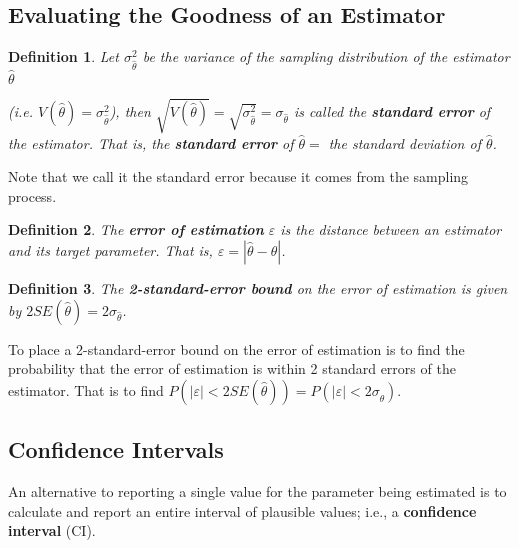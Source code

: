 \documentclass[a4paper,12pt]{article}
\theoremstyle{nonitalic}
\newtheorem{definition}{Definition}[subsection]
\begin{document}
    \subsection{Evaluating the Goodness of an Estimator}

    \begin{definition}
        Let \(\sigma^2_{\hat{\theta}}\) be the variance of the sampling distribution of the estimator \(\hat{\theta}\)

        (i.e. \(V(\hat{\theta}) = \sigma^2_{\hat{\theta}}\)), then \(\sqrt{V(\hat{\theta})} = \sqrt{\sigma^2_{\hat{\theta}}} = \sigma_{\hat{\theta}}\) is called the \textbf{standard error} of the estimator. That is, the \textbf{standard error} of \(\hat{\theta} =\) the standard deviation of \(\hat{\theta}\).
    \end{definition}
    Note that we call it the standard error because it comes from the sampling process.

    \bigskip

    \begin{definition}
        The \textbf{error of estimation} \(\varepsilon\) is the distance between an estimator and its target parameter. That is, \(\varepsilon = |\hat{\theta} - \theta|\).
    \end{definition}

    \bigskip

    \begin{definition}
        The \textbf{2-standard-error bound} on the error of estimation is given by $2SE(\hat{\theta}) = 2\sigma_{\hat{\theta}}$.
    \end{definition}
    To place a 2-standard-error bound on the error of estimation is to find the probability that the error of estimation is within 2 standard errors of the estimator. That is to find $P(|\varepsilon| < 2SE(\hat{\theta})) = P(|\varepsilon| < 2 \sigma_{\hat{\theta}})$.

    \newpage

    \subsection{Confidence Intervals}

    An alternative to reporting a single value for the parameter being estimated is to calculate and report an entire interval of plausible values; i.e., a \textbf{confidence interval} (CI).
\end{document}
